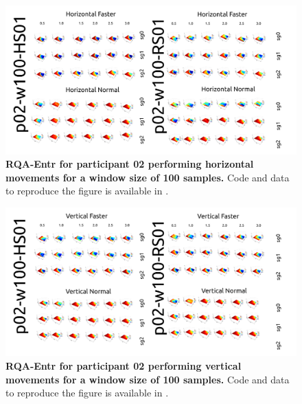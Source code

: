 \documentclass[12pt]{article}
\begin{document}
\newpage
\begin{figure}[ht!]
\centering
\includegraphics[scale=1.0]{figures/rqa/output/epsilons/rqa-epsilonsp02w100Horizontal}
    	\caption{
	{\bf RQA-Entr for participant 02 performing horizontal movements for a window size of 100 samples.}
	Code and data to reproduce the figure is available in \cite{srep2020}.
        }
    \label{fig-p02-H-w100}
\end{figure}
\begin{figure}[hb!]
\centering
\includegraphics[scale=1.0]{figures/rqa/output/epsilons/rqa-epsilonsp02w100Vertical}
    	\caption{
	{\bf RQA-Entr for participant 02 performing vertical movements for a window size of 100 samples.}
	Code and data to reproduce the figure is available in \cite{srep2020}.
        }
    \label{fig-p02-V-w100}
\end{figure}
\end{document}
